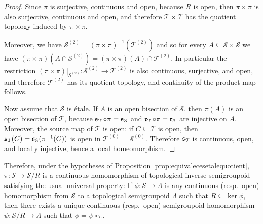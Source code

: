 \begin{proof}
    Since $\pi$ is surjective, continuous and open, because $R$ is open, then $\pi\times\pi$ is also surjective, continuous and open, and therefore $\mathcal{T}\times\mathcal{T}$ has the quotient topology induced by $\pi\times\pi$.
    
    Moreover, we have $\mathcal{S}^{(2)}=(\pi\times\pi)^{-1}\left(\mathcal{T}^{(2)}\right)$ and so for every $A\subseteq \mathcal{S}\times\mathcal{S}$ we have $(\pi\times\pi)(A\cap\mathcal{S}^{(2)})=(\pi\times\pi)(A)\cap\mathcal{T}^{(2)}$. In particular the restriction $(\pi\times\pi)|_{\mathcal{S}^{(2)}}\colon\mathcal{S}^{(2)}\to\mathcal{T}^{(2)}$ is also continuous, surjective, and open, and therefore $\mathcal{T}^{(2)}$ has its quotient topology, and continuity of the product map follows.
    
    Now assume that $\mathcal{S}$ is étale. If $A$ is an open bisection of $\mathcal{S}$, then $\pi(A)$ is an open bisection of $\mathcal{T}$, because $\operatorname{\mathfrak{s}}_{\mathcal{T}}\circ\pi=\operatorname{\mathfrak{s}}_{\mathcal{S}}$ and $\operatorname{\mathfrak{r}}_{\mathcal{T}}\circ\pi=\operatorname{\mathfrak{r}}_{\mathcal{S}}$ are injective on $A$. Moreover, the source map of $\mathcal{T}$ is open: if $C\subseteq\mathcal{T}$ is open, then $\operatorname{\mathfrak{s}}_{\mathcal{T}}(C)=\operatorname{\mathfrak{s}}_{\mathcal{S}}(\pi^{-1}(C))$ is open in $\mathcal{T}^{(0)}=\mathcal{S}^{(0)}$. Therefore $\operatorname{\mathfrak{s}}_{\mathcal{T}}$ is continuous, open, and locally injective, hence a local homeomorphism.\qedhere
\end{proof}

Therefore, under the hypotheses of Proposition \ref{prop:equivalecesetalequotient}, $\pi\colon\mathcal{S}\to\mathcal{S}/R$ is a continuous homomorphism of topological inverse semigroupoid satisfying the usual universal property: If $\phi\colon\mathcal{S}\to\Lambda$ is any continuous (resp.\ open) homomorphism from $\mathcal{S}$ to a topological semigroupoid $\Lambda$ such that $R\subseteq\ker\phi$, then there exists a unique continuous (resp.\ open) semigroupoid homomorphism $\psi\colon\mathcal{S}/R\to\Lambda$ such that $\phi=\psi\circ\pi$.

